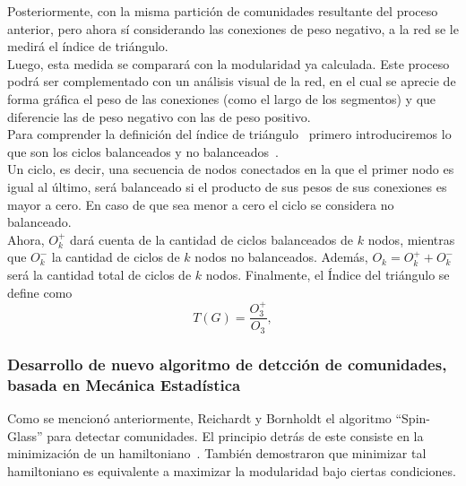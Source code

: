 \documentclass{proyectotesis}
\begin{document}
Posteriormente, con la misma partición de comunidades resultante del proceso anterior, pero ahora sí considerando las conexiones de peso negativo, a la red se le medirá el índice de triángulo. \\

Luego, esta medida se comparará con la modularidad ya calculada. Este proceso podrá ser complementado con un análisis visual de la red, en el cual se aprecie de forma gráfica el peso de las conexiones (como el largo de los segmentos) y que diferencie las de peso negativo con las de peso positivo.\\

Para comprender la definición del índice de triángulo~\cite{aref_measuring_2018} primero introduciremos lo que son los ciclos balanceados y no balanceados~\cite{aref_measuring_2018}.\\

Un ciclo, es decir, una secuencia de nodos conectados en la que el primer nodo es igual al último, será balanceado si el producto de sus pesos de sus conexiones es mayor a cero. En caso de que sea menor a cero el ciclo se considera no balanceado.\\

Ahora, $O_k^+$ dará cuenta de la cantidad de ciclos balanceados de $k$ nodos, mientras que $O_k^-$ la cantidad de ciclos de $k$ nodos no balanceados. Además, $O_k = O_k^+ + O_k^-$ será la cantidad total de ciclos de $k$ nodos. Finalmente, el Índice del triángulo se define como
\begin{equation}
    T(G) = \frac{O_3^+}{O_3},
\end{equation}

\subsubsection{Desarrollo de nuevo algoritmo de detcción de comunidades, basada en Mecánica Estadística} 
Como se mencionó anteriormente, Reichardt y Bornholdt el algoritmo ``Spin-Glass'' para detectar comunidades. El principio detrás de este consiste en la minimización de un hamiltoniano~\cite{reichardt_statistical_2006}. También demostraron que minimizar tal hamiltoniano es equivalente a maximizar la modularidad bajo ciertas condiciones. 
\end{document}
